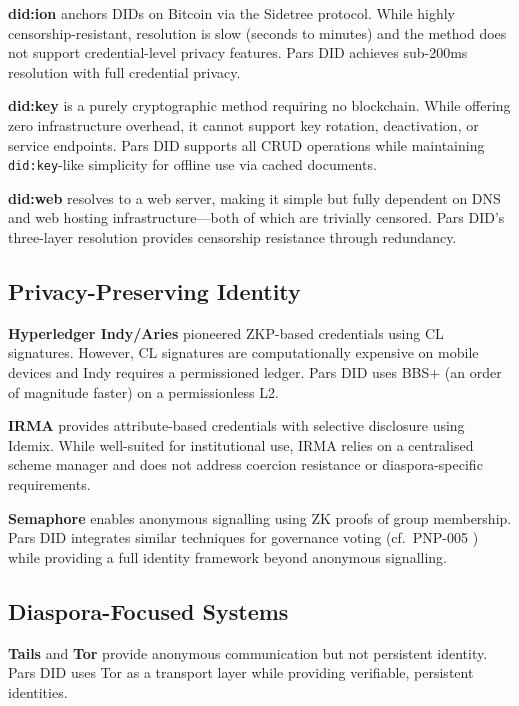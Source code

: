 \documentclass[11pt,a4paper]{article}
\begin{document}
\textbf{did:ion} \cite{did-ion} anchors DIDs on Bitcoin via the Sidetree protocol.
While highly censorship-resistant, resolution is slow (seconds to minutes) and the
method does not support credential-level privacy features. Pars DID achieves
sub-200ms resolution with full credential privacy.

\textbf{did:key} \cite{did-key} is a purely cryptographic method requiring no
blockchain. While offering zero infrastructure overhead, it cannot support key
rotation, deactivation, or service endpoints. Pars DID supports all CRUD operations
while maintaining \texttt{did:key}-like simplicity for offline use via cached
documents.

\textbf{did:web} \cite{did-web} resolves to a web server, making it simple but
fully dependent on DNS and web hosting infrastructure---both of which are trivially
censored. Pars DID's three-layer resolution provides censorship resistance through
redundancy.

\subsection{Privacy-Preserving Identity}

\textbf{Hyperledger Indy/Aries} \cite{hyperledger-indy} pioneered ZKP-based
credentials using CL signatures. However, CL signatures are computationally
expensive on mobile devices and Indy requires a permissioned ledger. Pars DID uses
BBS+ (an order of magnitude faster) on a permissionless L2.

\textbf{IRMA} \cite{irma} provides attribute-based credentials with selective
disclosure using Idemix. While well-suited for institutional use, IRMA relies on
a centralised scheme manager and does not address coercion resistance or diaspora-specific
requirements.

\textbf{Semaphore} \cite{semaphore} enables anonymous signalling using ZK proofs
of group membership. Pars DID integrates similar techniques for governance voting
(cf.\ PNP-005 \cite{pnp005}) while providing a full identity framework beyond
anonymous signalling.

\subsection{Diaspora-Focused Systems}

\textbf{Tails} \cite{tails} and \textbf{Tor} \cite{tor} provide anonymous communication
but not persistent identity. Pars DID uses Tor as a transport layer while providing
verifiable, persistent identities.
\end{document}
